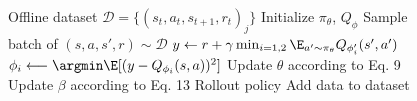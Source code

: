 \begin{wrapfigure}{R}{0.5\textwidth}
\begin{minipage}{0.99\textwidth}
    \begin{algorithm}[H]
       	\fcaption{\METHOD}
       	\label{alg:method}
       	\begin{algorithmic}[1]
       	\STATE Offline dataset $\mathcal{D} = \{(s_t, a_t, s_{t+1}, r_t)_j\}$
       	\STATE Initialize $\pi_\theta$, $Q_\phi$ 
       	    \STATE Sample batch of $(s, a, s', r) \sim \mathcal{D}$
            \STATE $y \gets r + \gamma \min_{i=1,2} \E_{a' \sim \pi_\theta} Q_{\phi'_i}(s', a')$
            \STATE $\phi_{i} \longleftarrow \argmin \E[(y - Q_{\phi_i}(s, a))^2]$
            \STATE Update $\theta$ according to Eq. 9
            \STATE Update $\beta$ according to Eq. 13
                \STATE Rollout policy
                \STATE Add data to dataset
            \ENDIF
       	\ENDFOR
       	\end{algorithmic}
    \end{algorithm}
\end{minipage}
\end{wrapfigure}